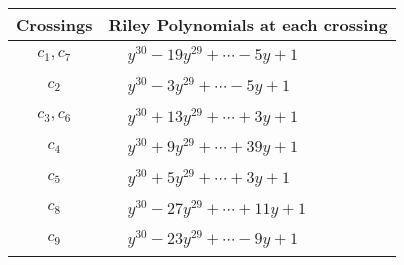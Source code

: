 \documentclass[1p]{elsarticle_modified}
\theoremstyle{definition}
\begin{document}
\begin{tabular}{m{50pt}|m{274pt}}
Crossings & \hspace{64pt}Riley Polynomials at each crossing \\
\hline $$\begin{aligned}c_{1},c_{7}\end{aligned}$$&$\begin{aligned}
&y^{30}-19 y^{29}+\cdots-5 y+1
\end{aligned}$\\
\hline $$\begin{aligned}c_{2}\end{aligned}$$&$\begin{aligned}
&y^{30}-3 y^{29}+\cdots-5 y+1
\end{aligned}$\\
\hline $$\begin{aligned}c_{3},c_{6}\end{aligned}$$&$\begin{aligned}
&y^{30}+13 y^{29}+\cdots+3 y+1
\end{aligned}$\\
\hline $$\begin{aligned}c_{4}\end{aligned}$$&$\begin{aligned}
&y^{30}+9 y^{29}+\cdots+39 y+1
\end{aligned}$\\
\hline $$\begin{aligned}c_{5}\end{aligned}$$&$\begin{aligned}
&y^{30}+5 y^{29}+\cdots+3 y+1
\end{aligned}$\\
\hline $$\begin{aligned}c_{8}\end{aligned}$$&$\begin{aligned}
&y^{30}-27 y^{29}+\cdots+11 y+1
\end{aligned}$\\
\hline $$\begin{aligned}c_{9}\end{aligned}$$&$\begin{aligned}
&y^{30}-23 y^{29}+\cdots-9 y+1
\end{aligned}$\\
\hline
\end{tabular}
\vskip 2pc
\end{document}
